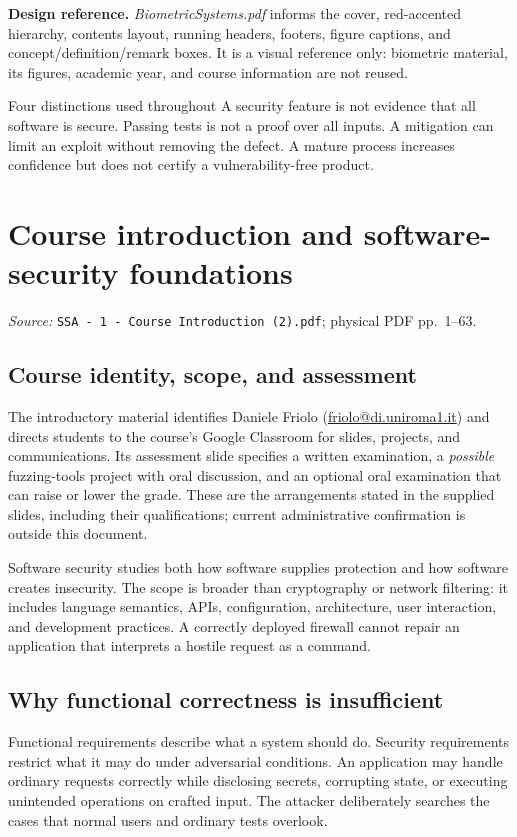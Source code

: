 \documentclass[11pt,a4paper]{article}
\newcommand{\currentmodule}{Contents}
\newcommand{\source}[2]{\textcolor{muted}{\small\textit{Source:} \nolinkurl{#1}; physical PDF pp.~#2.}\par\medskip}
\numberwithin{figure}{section}
\begin{document}
\textbf{Design reference.} \emph{BiometricSystems.pdf} informs the cover, red-accented hierarchy, contents layout, running headers, footers, figure captions, and concept/definition/remark boxes. It is a visual reference only: biometric material, its figures, academic year, and course information are not reused.

\begin{concept}{Four distinctions used throughout}
A security feature is not evidence that all software is secure. Passing tests is not a proof over all inputs. A mitigation can limit an exploit without removing the defect. A mature process increases confidence but does not certify a vulnerability-free product.
\end{concept}

\clearpage{}
\gdef\currentmodule{Course introduction and software-security foundations}
\section{Course introduction and software-security foundations}\label{sec:intro}
\source{SSA - 1 - Course Introduction (2).pdf}{1--63}
\subsection{Course identity, scope, and assessment}
The introductory material identifies Daniele Friolo (\href{mailto:friolo@di.uniroma1.it}{friolo@di.uniroma1.it}) and directs students to the course's Google Classroom for slides, projects, and communications. Its assessment slide specifies a written examination, a \emph{possible} fuzzing-tools project with oral discussion, and an optional oral examination that can raise or lower the grade. These are the arrangements stated in the supplied slides, including their qualifications; current administrative confirmation is outside this document.

Software security studies both how software supplies protection and how software creates insecurity. The scope is broader than cryptography or network filtering: it includes language semantics, APIs, configuration, architecture, user interaction, and development practices. A correctly deployed firewall cannot repair an application that interprets a hostile request as a command.

\subsection{Why functional correctness is insufficient}
Functional requirements describe what a system should do. Security requirements restrict what it may do under adversarial conditions. An application may handle ordinary requests correctly while disclosing secrets, corrupting state, or executing unintended operations on crafted input. The attacker deliberately searches the cases that normal users and ordinary tests overlook.
\end{document}
